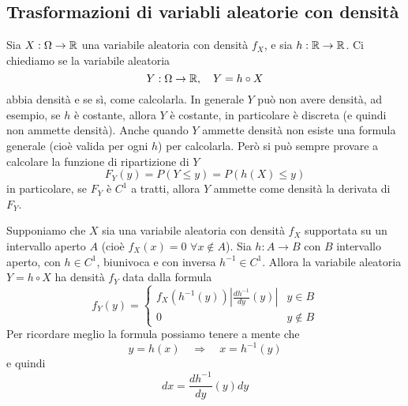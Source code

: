 \subsection{Trasformazioni di variabli aleatorie con densità}
Sia $X : \Omega \to \mathbb{R}$ una variabile aleatoria con densità $f_X$, e sia $h : \mathbb{R} \to \mathbb{R}$. Ci
chiediamo se la variabile aleatoria
\[ Y : \Omega \to \mathbb{R}, \quad Y = h \circ X \]
abbia densità e se sì, come calcolarla. In generale $Y$ può non avere densità, ad esempio, se $h$
è costante, allora $Y$ è costante, in particolare è discreta (e quindi non ammette densità).
Anche quando $Y$ ammette densità non esiste una formula generale (cioè valida per ogni $h$) per
calcolarla. Però si può sempre provare a calcolare la funzione di ripartizione di $Y$
\[ F_Y (y) = P(Y \leq y) = P(h(X) \leq y) \]
in particolare, se $F_Y$ è $C^1$ a tratti, allora $Y$ ammette come densità la derivata di $F_Y$.

\begin{proposition}
	Supponiamo che $X$ sia una variabile aleatoria con densità $f_X$ supportata su un intervallo
	aperto $A$ (cioè $f_X(x) = 0$ $\forall x \notin A$). Sia $h : A \to B$ con $B$ intervallo
	aperto, con $h \in C^1$, biunivoca e con inversa $h^{-1} \in C^1$. Allora la variabile
	aleatoria $Y = h \circ X$ ha densità $f_Y$ data dalla formula
	\[
		f_Y(y) = \begin{cases}
			f_X (h^{-1} (y)) \left| \frac{d h^{-1}}{dy} (y) \right| & y \in B    \\[1ex]
			0                                                       & y \notin B
		\end{cases}
	\]
	Per ricordare meglio la formula possiamo tenere a mente che
	\[ y = h(x) \quad \Rightarrow \quad x = h^{-1}(y) \]
	e quindi
	\[ dx = \frac{d h^{-1}}{dy} (y) dy \]
\end{proposition}

